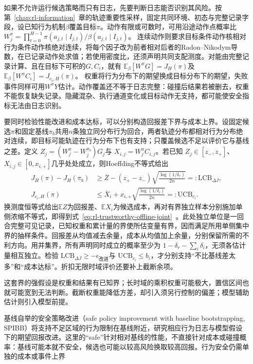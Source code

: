 如果不允许运行候选策略而只有日志，先要判断日志能否识别其风险。按第~\ref{chap:rl-information}~章的轨迹重要性采样，固定共同环境、初态与完整记录字段，设已知行为机制$\beta$覆盖目标$\pi$。动作有限或可数时，可用沿途动作点概率比
$W_j^\pi=\prod_{t=0}^{H-1}\pi(a_{j,t}\mid I_{j,t})/
\beta(a_{j,t}\mid I_{j,t})$。
连续动作则要求目标条件动作核相对行为条件动作核绝对连续，将每个因子改为前者相对后者的Radon--Nikodym导数，在已记录动作处求值；若使用密度比，还须声明共同支配测度。对能由完整记录计算、且在目标下可积的$G,C_i$，就有
$\mathbb E_\beta[W^\pi G]=J_H(\pi)$及
$\mathbb E_\beta[W^\pi C_i]=J_{c_i,H}(\pi)$。
权重将行为分布下的期望换成目标分布下的期望，失败事件同样可用$W^\pi Y$估计。动作覆盖还不等于日志完整：碰撞后结果若被删去，权重不能恢复缺失记录。隐藏混杂、执行通道变化或目标动作无支持，都可能使安全指标无法由日志识别。

要同时检验性能改进和成本达标，可以分别构造回报差下界与成本上界。设固定候选$\pi$和固定基线$\pi_b$共用$n$条独立同分布行为回合，两者轨迹分布都相对行为分布绝对连续，即目标可能轨迹在行为分布下也有支持；只覆盖候选不足以评价它与基线之差。定义
$Z_j=(W_j^\pi-W_j^{\pi_b})G_j$与
$X_{i,j}=W_j^\pi C_{i,j}$。若已知
$Z_j\in[z_-,z_+]$、$X_{i,j}\in[0,x_{i,+}]$几乎处处成立，则Hoeffding不等式给出
\begin{align}
  J_H(\pi)-J_H(\pi_b)
     &\geq \overline Z
        -(z_+-z_-)\sqrt{\frac{\log(1/\delta_r)}{2n}}
        =:\mathrm{LCB}_{\Delta J}, \nonumber\\
  J_{c_i,H}(\pi)
     &\leq \overline X_i
        +x_{i,+}\sqrt{\frac{\log(1/\delta_i)}{2n}}
        =:\mathrm{UCB}_{c_i}.
  \label{eq:rl-trustworthy-offline-joint}
\end{align}
换测度恒等式给出$\mathbb E Z$为回报差、$\mathbb E X_i$为候选成本，再对有界独立样本分别施加单侧浓缩不等式，即得到式~\eqref{eq:rl-trustworthy-offline-joint}~。此处独立单位是一回合完整可见记录，已知权重和累计量的界使所估变量有界，因而满足所用单侧集中界的抽样条件。回报差从均值减去余量，成本从均值加上余量，分别保留所需的不利方向。用并集界，所有声明同时成立的概率至少为
$1-\delta_r-\sum_i\delta_i$，无须各估计量相互独立。检验
$\mathrm{LCB}_{\Delta J}\geq-\epsilon_{\text{改进}}$与
$\mathrm{UCB}_{c_i}\leq b_i$，才分别支持“不比基线差太多”和“成本达标”。折扣无限时域评价还要补上截断余项。

这套界的强假设是权重和结果有已知界；长时域的乘积权重可能极大，置信区间也就可能宽到无法判断。截断权重能降低方差，却引入须另行控制的偏差；模型辅助估计则引入模型前提。

基线自举的安全策略改进（safe policy improvement with baseline bootstrapping, SPIBB）将支持不足区域的行为限制在基线附近，研究相应行为日志与模型假设下的期望回报改进。这里的“safe”针对相对基线的性能，不直接针对成本或碰撞概率：基线可能本就不安全，候选也可能以较高风险换取较高回报。行为安全仍需单独的成本或事件上界

